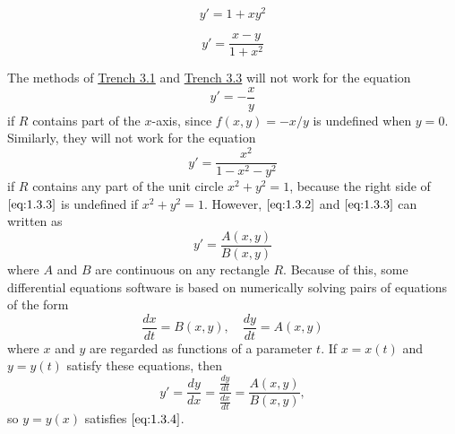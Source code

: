 \documentclass{ximera}
\begin{document}
\begin{example}\label{ex:fig010303}
$$
y'=1+xy^2
$$

\begin{center}  
\end{center}

\end{example}
\begin{example}\label{ex:fig010304}
$$
y'=\frac{x-y}{1+x^2}
$$

\begin{center}  
\end{center}

\end{example}
The methods of \href{https://ximera.osu.edu/ode/main/eulersMethod/eulersMethod}{Trench 3.1} and \href{https://ximera.osu.edu/ode/main/rungeKutta/rungeKutta}{Trench 3.3} will not work for the equation
\begin{equation} \label{eq:1.3.2}
y'=-\frac{x}{y}
\end{equation}
if $R$ contains part of the $x$-axis, since $f(x,y)=-x/y$ is undefined
when $y=0$. Similarly, they will not work for the equation
\begin{equation} \label{eq:1.3.3}
y'=\frac{x^2}{1-x^2-y^2}
\end{equation}
if $R$ contains any part of the unit circle $x^2+y^2=1$, because the
right side of $\eqref{eq:1.3.3}$ is undefined if $x^2+y^2=1$. However,
$\eqref{eq:1.3.2}$ and $\eqref{eq:1.3.3}$ can written as
\begin{equation} \label{eq:1.3.4}
y'=\frac{A(x,y)}{B(x,y)}
\end{equation}
where $A$ and $B$ are continuous on any rectangle $R$. Because of
this, some differential equations software is based on
numerically solving pairs of equations of the form
\begin{equation} \label{eq:1.3.5}
\frac{dx}{dt}=B(x,y),\quad \frac{dy}{dt}=A(x,y)
\end{equation}
where $x$ and $y$ are regarded as functions of a parameter $t$.
If $x=x(t)$ and $y=y(t)$  satisfy these equations, then
$$
y'=\frac{dy}{dx}=\frac{\frac{dy}{dt}}{\frac{dx}{dt}}=\frac{A(x,y)}{B(x,y)},
$$
so $y=y(x)$ satisfies $\eqref{eq:1.3.4}$.
 
\end{document}
